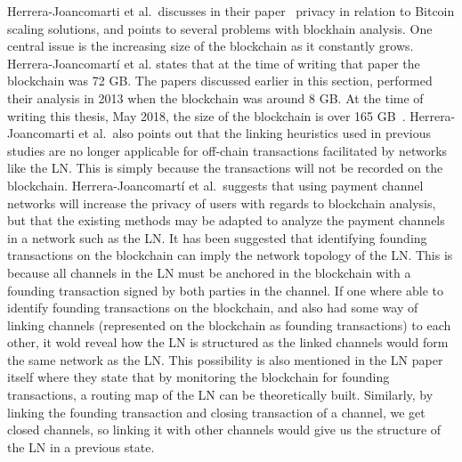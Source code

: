 Herrera-Joancomarti et al.~discusses in their paper~\cite{herrera2016privacy} privacy in relation to Bitcoin scaling solutions, and points to several problems with blockhain analysis. One central issue is the increasing size of the blockchain as it constantly grows. Herrera-Joancomartí et al. states that at the time of writing that paper the blockchain was 72 GB. The papers discussed earlier in this section, performed their analysis in 2013 when the blockchain was around 8 GB. At the time of writing this thesis, May 2018, the size of the blockchain is over 165 GB~\cite{blockchain_size}.
Herrera-Joancomarti et al.~also points out that the linking heuristics used in previous studies are no longer applicable for off-chain transactions facilitated by networks like the LN. This is simply because the transactions will not be recorded on the blockchain. Herrera-Joancomartí et al.~suggests that using payment channel networks will increase the privacy of users with regards to blockchain analysis, but that the existing methods may be adapted to analyze the payment channels in a network such as the LN. 
It has been suggested that identifying founding transactions on the blockchain can imply the network topology \cite{rusty_routing1} of the LN. This is because all channels in the LN must be anchored in the blockchain with a founding transaction signed by both parties in the channel. If one where able to identify founding transactions on the blockchain, and also had some way of linking channels (represented on the blockchain as founding transactions) to each other, it wold reveal how the LN is structured as the linked channels would form the same network as the LN. This possibility is also mentioned in the LN paper itself \cite{poon2015bitcoin} where they state that by monitoring the blockchain for founding transactions, a routing map of the LN can be theoretically built.
Similarly, by linking the founding transaction and closing transaction of a channel, we get closed channels, so linking it with other channels would give us the structure of the LN in a previous state. 


